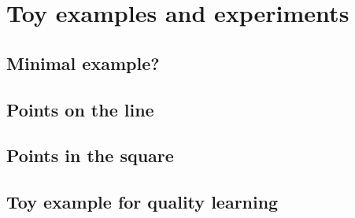\chapter{Toy examples and experiments}

\section{Minimal example?}

\section{Points on the line}

\section{Points in the square}

\section{Toy example for quality learning}